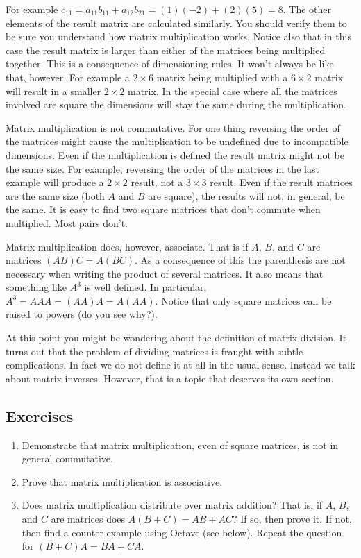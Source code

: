 For example $c_{11} = a_{11}b_{11} + a_{12}b_{21} = (1)(-2) + (2)(5) = 8$. The other elements of
the result matrix are calculated similarly. You should verify them to be sure you understand how
matrix multiplication works. Notice also that in this case the result matrix is larger than
either of the matrices being multiplied together. This is a consequence of dimensioning rules.
It won't always be like that, however. For example a $2 \times 6$ matrix being multiplied with a
$6 \times 2$ matrix will result in a smaller $2 \times 2$ matrix. In the special case where all
the matrices involved are square the dimensions will stay the same during the multiplication.

Matrix multiplication is not commutative. For one thing reversing the order of the matrices
might cause the multiplication to be undefined due to incompatible dimensions. Even if the
multiplication is defined the result matrix might not be the same size. For example, reversing
the order of the matrices in the last example will produce a $2 \times 2$ result, not a $3
\times 3$ result. Even if the result matrices are the same size (both $A$ and $B$ are square),
the results will not, in general, be the same. It is easy to find two square matrices that don't
commute when multiplied. Most pairs don't.

Matrix multiplication does, however, associate. That is if $A$, $B$, and $C$ are matrices $(AB)C
= A(BC)$. As a consequence of this the parenthesis are not necessary when writing the product of
several matrices. It also means that something like $A^3$ is well defined. In particular, $A^3 =
AAA = (AA)A = A(AA)$. Notice that only square matrices can be raised to powers (do you see
why?).

At this point you might be wondering about the definition of matrix division. It turns out that
the problem of dividing matrices is fraught with subtle complications. In fact we do not define
it at all in the usual sense. Instead we talk about matrix inverses. However, that is a topic
that deserves its own section.

\subsection*{Exercises}

\begin{enumerate}

\item Demonstrate that matrix multiplication, even of square matrices, is not in general
  commutative.

\item Prove that matrix multiplication is associative.

\item Does matrix multiplication distribute over matrix addition? That is, if $A$, $B$, and $C$
  are matrices does $A(B + C) = AB + AC$? If so, then prove it. If not, then find a counter
  example using Octave (see below). Repeat the question for $(B + C)A = BA + CA$.

\end{enumerate}

